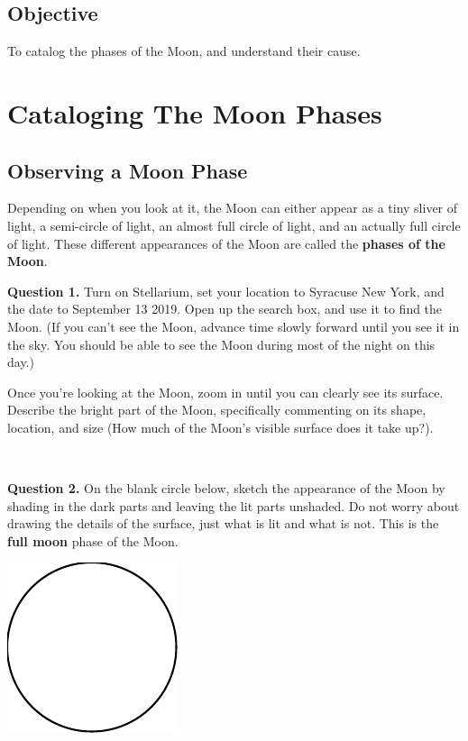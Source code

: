 \documentclass[11pt]{article}
\begin{document}
\subsection*{Objective}

To catalog the phases of the Moon, and understand their cause.

\newpage

\section{Cataloging The Moon Phases}

\subsection{Observing a Moon Phase}

Depending on when you look at it, the Moon can either appear as a tiny sliver of light, a semi-circle of light, an almost full circle of light, and an actually full circle of light. These different appearances of the Moon are called the \textbf{phases of the Moon}.

\noindent
\textbf{Question 1.} Turn on Stellarium, set your location to Syracuse New York, and the date to September 13 2019. Open up the search box, and use it to find the Moon. (If you can't see the Moon, advance time slowly forward until you see it in the sky. You should be able to see the Moon during most of the night on this day.)

Once you're looking at the Moon, zoom in until you can clearly see its surface.\\

Describe the bright part of the Moon, specifically commenting on its shape, location, and size (How much of the Moon's visible surface does it take up?).\\
\vspace*{1.5cm}

\hrulefill\\
\noindent

\textbf{Question 2.} On the blank circle below, sketch the appearance of the Moon by shading in the dark parts and leaving the lit parts unshaded. Do not worry about drawing the details of the surface, just what is lit and what is not. This is the \textbf{full moon} phase of the Moon.\\
\begin{center}
	\includegraphics{blank_moon}
\end{center}
\end{document}
